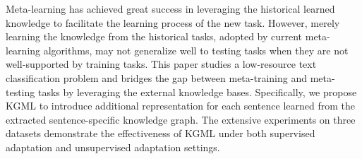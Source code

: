 Meta-learning has achieved great success in leveraging the historical learned knowledge to facilitate the learning process of the new task. However, merely learning the knowledge from the historical tasks, adopted by current meta-learning algorithms, may not generalize well to testing tasks when they are not well-supported by training tasks. This paper studies a low-resource text classification problem and bridges the gap between meta-training and meta-testing tasks by leveraging the external knowledge bases. Specifically, we propose KGML to introduce additional representation for each sentence learned from the extracted sentence-specific knowledge graph. The extensive experiments on three datasets demonstrate the effectiveness of KGML under both supervised adaptation and unsupervised adaptation settings.

